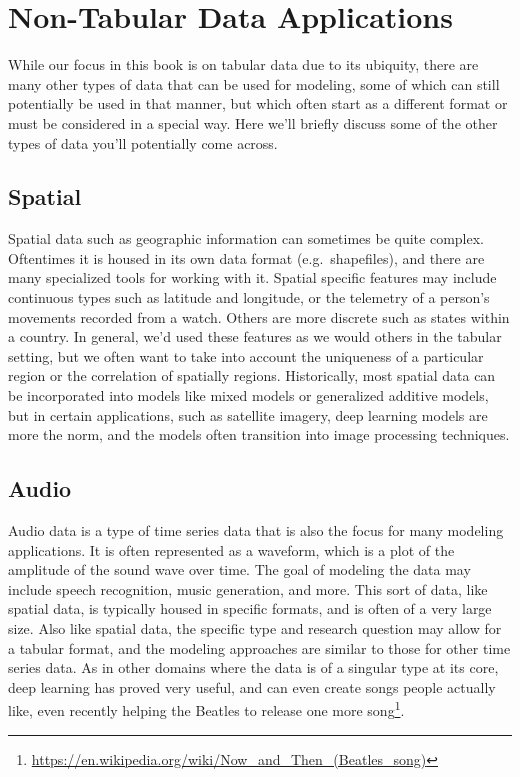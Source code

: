 \documentclass[
  letterpaper,
]{krantz}
\DeclareRobustCommand{\href}[2]{#2\footnote{\url{#1}}}
\begin{document}
\section{Non-Tabular Data Applications}\label{sec-ml-more-non-tabular}

While our focus in this book is on tabular data due to its ubiquity,
there are many other types of data that can be used for modeling, some
of which can still potentially be used in that manner, but which often
start as a different format or must be considered in a special way. Here
we'll briefly discuss some of the other types of data you'll potentially
come across.

\subsection{Spatial}\label{spatial}

Spatial data such as geographic information can sometimes be quite
complex. Oftentimes it is housed in its own data format
(e.g.~shapefiles), and there are many specialized tools for working with
it. Spatial specific features may include continuous types such as
latitude and longitude, or the telemetry of a person's movements
recorded from a watch. Others are more discrete such as states within a
country. In general, we'd used these features as we would others in the
tabular setting, but we often want to take into account the uniqueness
of a particular region or the correlation of spatially regions.
Historically, most spatial data can be incorporated into models like
mixed models or generalized additive models, but in certain
applications, such as satellite imagery, deep learning models are more
the norm, and the models often transition into image processing
techniques.

\subsection{Audio}\label{audio}

Audio data is a type of time series data that is also the focus for many
modeling applications. It is often represented as a waveform, which is a
plot of the amplitude of the sound wave over time. The goal of modeling
the data may include speech recognition, music generation, and more.
This sort of data, like spatial data, is typically housed in specific
formats, and is often of a very large size. Also like spatial data, the
specific type and research question may allow for a tabular format, and
the modeling approaches are similar to those for other time series data.
As in other domains where the data is of a singular type at its core,
deep learning has proved very useful, and can even create songs people
actually like,
\href{https://en.wikipedia.org/wiki/Now_and_Then_(Beatles_song)}{even
recently helping the Beatles to release one more song}.
\end{document}
